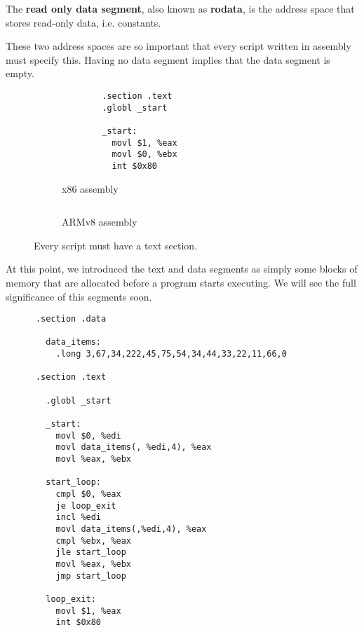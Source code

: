   \begin{definition}
    The \textbf{read only data segment}, also known as \textbf{rodata}, is the address space that stores read-only data, i.e. constants. 
  \end{definition}

  These two address spaces are so important that every script written in assembly must specify this. Having no data segment implies that the data segment is empty. 

  \begin{figure}[H]
    \centering
    \begin{subfigure}[b]{0.48\textwidth}
      \centering
      \begin{lstlisting}
        .section .text
        .globl _start

        _start:
          movl $1, %eax 
          movl $0, %ebx 
          int $0x80  
      \end{lstlisting}
      \caption{x86 assembly}
    \end{subfigure}
    \hfill 
    \begin{subfigure}[b]{0.48\textwidth}
      \centering
      \begin{lstlisting}
      \end{lstlisting}
      \caption{ARMv8 assembly}
    \end{subfigure}
    \caption{Every script must have a text section.}
  \end{figure}

  At this point, we introduced the text and data segments as simply some blocks of memory that are allocated before a program starts executing. We will see the full significance of this segments soon. 

  \begin{example}
    \begin{lstlisting}
      .section .data

        data_items: 
          .long 3,67,34,222,45,75,54,34,44,33,22,11,66,0

      .section .text

        .globl _start

        _start:
          movl $0, %edi
          movl data_items(, %edi,4), %eax
          movl %eax, %ebx

        start_loop: 
          cmpl $0, %eax 
          je loop_exit 
          incl %edi 
          movl data_items(,%edi,4), %eax 
          cmpl %ebx, %eax
          jle start_loop 
          movl %eax, %ebx
          jmp start_loop 

        loop_exit: 
          movl $1, %eax 
          int $0x80 
    \end{lstlisting}
  \end{example}

